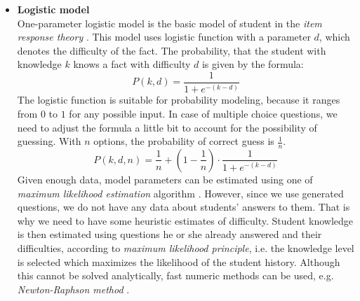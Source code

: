 \documentclass[12pt, twoside]{fithesis2}		%
\renewcommand{\_}{\leavevmode \kern0.07em\vbox{\hrule width0.4em}}
\newcommand{\squarebullet}{\textcolor{black}{\raisebox{0.15em}{\rule{4pt}{4pt}}}}
\newcommand{\emptysquarebullet}{\textcolor{black}{\raisebox{0.10em}{\tiny$\square$}}}
\newenvironment{myItemize}{
  \begin{itemize}[leftmargin=2em,rightmargin=1em,itemsep=\parskip ,parsep=0em,topsep=0em,partopsep=0em]
  \renewcommand{\labelitemi}{\squarebullet}
  \renewcommand{\labelitemii}{\textbullet}
}{
  \end{itemize}
}
\newcounter{choice}
\begin{document}
\begin{myItemize}
\item \textbf{Logistic model}\\
  One-parameter logistic model is the basic model of student in the
  \emph{item response theory} \cite{visual-irt}.
  This model uses logistic function with a parameter $d$, which denotes the difficulty of the fact.
  The probability, that the student with knowledge $k$ knows a fact with difficulty $d$ is given by the formula:
  \begin{equation}\label{eq:logistic}
  P(k, d) = \frac{1}{1 + e^{-(k - d)}}
  \end{equation}
  The logistic function is suitable for probability modeling, because it ranges from $0$ to $1$ for any possible input.
  In case of multiple choice questions, we need to adjust the formula a little bit to account for the possibility of guessing.
  With $n$ options, the probability of correct guess is $\frac{1}{n}$.
\begin{equation}\label{eq:logistic-mcq}
P(k, d, n) = \frac{1}{n} + \left( 1 - \frac{1}{n} \right) \cdot \frac{1}{1 + e^{-(k - d)}}
\end{equation}
Given enough data, model parameters can be estimated using
one of \emph{maximum likelihood estimation} algorithm \cite{irt-theory-and-practice}.
However, since we use generated questions, we do not have any data about students' answers to them.
That is why we need to have some heuristic estimates of difficulty.
Student knowledge is then estimated using questions he or she already answered and their difficulties,
according to \emph{maximum likelihood principle}, i.e. the knowledge level is selected which maximizes the likelihood of the student history.
Although this cannot be solved analytically, fast numeric methods can be used,
e.g. \emph{Newton-Raphson method} \cite{irt-ability-estimation}.

\begin{figure}[h]
  \centering


\end{figure}
\end{myItemize}
\end{document}
